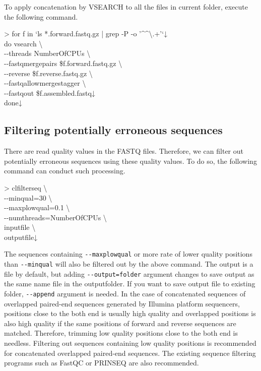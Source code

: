 \documentclass[titlepage,10pt,a4paper,english]{jsbook}
\newenvironment{cmd}{\begin{oframed}\raggedright\ttfamily\footnotesize\setlength{\baselineskip}{1.4em}}{\end{oframed}\vspace{-1em}}
\begin{document}
To apply concatenation by VSEARCH to all the files in current folder, execute the following command.

\begin{cmd}
{\textgreater} for f in `ls *.forward.fastq.gz | grep -P -o '{\textasciicircum}{\lbrack}{\textasciicircum}{\textbackslash}.{\rbrack}+'`↓\\
do vsearch {\textbackslash}\\
{-}{-}threads NumberOfCPUs {\textbackslash}\\
{-}{-}fastq{\textunderscore}mergepairs \$f.forward.fastq.gz {\textbackslash}\\
{-}{-}reverse \$f.reverse.fastq.gz {\textbackslash}\\
{-}{-}fastq{\textunderscore}allowmergestagger {\textbackslash}\\
{-}{-}fastqout \$f.assembled.fastq↓\\
done↓
\end{cmd}

\subsection{Filtering potentially erroneous sequences}

There are read quality values in the FASTQ files.
Therefore, we can filter out potentially erroneous sequences using these quality values.
To do so, the following command can conduct such processing.

\begin{cmd}
{\textgreater} clfilterseq {\textbackslash}\\
{-}{-}minqual=30 {\textbackslash}\\
{-}{-}maxplowqual=0.1 {\textbackslash}\\
{-}{-}numthreads=NumberOfCPUs {\textbackslash}\\
inputfile {\textbackslash}\\
outputfile↓
\end{cmd}

The sequences containing \texttt{{-}{-}maxplowqual} or more rate of lower quality positions than \texttt{{-}{-}minqual} will also be filtered out by the above command.
The output is a file by default, but adding \texttt{{-}{-}output=folder} argument changes to save output as the same name file in the outputfolder.
If you want to save output file to existing folder, \texttt{{-}{-}append} argument is needed.
In the case of concatenated sequences of overlapped paired-end sequences generated by Illumina platform sequencers, positions close to the both end is usually high quality and overlapped positions is also high quality if the same positions of forward and reverse sequences are matched.
Therefore, trimming low quality positions close to the both end is needless.
Filtering out sequences containing low quality positions is recommended for concatenated overlapped paired-end sequences.
The existing sequence filtering programs such as FastQC \citep{Andrews2010} or PRINSEQ \citep{Schmieder2011} are also recommended.
\end{document}
